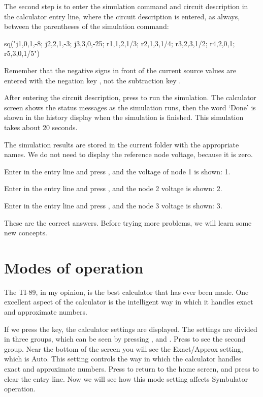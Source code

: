 The second step is to enter the simulation command and circuit
description in the calculator entry line, where the circuit
description is entered, as always, between the parentheses of the
simulation command:

\begin{entry}
sq\dc("j1,0,1,-8; j2,2,1,-3; j3,3,0,-25; r1,1,2,1/3;
      r2,1,3,1/4; r3,2,3,1/2; r4,2,0,1; r5,3,0,1/5")
\end{entry}

Remember that the negative signs in front of the current source
values are entered with the negation key \key{($-$)}, not the
subtraction key \key{$-$}.

After entering the circuit description, press  to run the
simulation. The calculator screen shows the status messages as the
simulation runs, then the word `Done' is shown in the history
display when the simulation is finished. This simulation takes about
20 seconds.

The simulation results are stored in the current folder with the
appropriate names. We do not need to display the reference node
voltage, because it is zero.

Enter  in the entry line and press , and the
voltage of node 1 is shown: 1.

Enter  in the entry line and press , and the
node 2 voltage is shown: 2.

Enter  in the entry line and press , and the
node 3 voltage is shown: 3.

These are the correct answers. Before trying more problems, we will
learn some new concepts.

\section{Modes of operation}

The TI-89, in my opinion, is the best calculator that has ever been
made. One excellent aspect of the calculator is the intelligent way
in which it handles exact and approximate numbers.

If we press the  key, the calculator settings are
displayed. The settings are divided in three groups, which can be
seen by pressing ,  and . Press  to
see the second group. Near the bottom of the screen you will see the
Exact/Approx setting, which is Auto. This setting controls the way
in which the calculator handles exact and approximate numbers. Press
 to return to the home screen, and press  to
clear the entry line. Now we will see how this mode setting affects
Symbulator operation.

